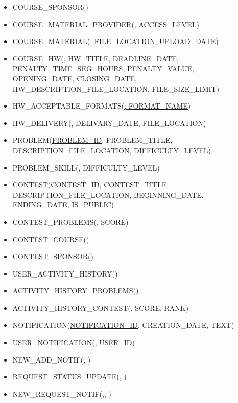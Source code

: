\documentclass{article}
\begin{document}
\begin{flushleft}
\begin{latin}
\begin{itemize}
            \item COURSE\_SPONSOR(\underline{})
            \item COURSE\_MATERIAL\_PROVIDER(\underline{}, ACCESS\_LEVEL)
            \item COURSE\_MATERIAL(\underline{, FILE\_LOCATION}, UPLOAD\_DATE)
            \item COURSE\_HW(\underline{, HW\_TITLE}, DEADLINE\_DATE, PENALTY\_TIME\_SEG\_HOURS, PENALTY\_VALUE, OPENING\_DATE, CLOSING\_DATE, HW\_DESCRIPTION\_FILE\_LOCATION, FILE\_SIZE\_LIMIT)
            \item HW\_ACCEPTABLE\_FORMATS(\underline{, FORMAT\_NAME})
            \item HW\_DELIVERY(\underline{}, DELIVARY\_DATE, FILE\_LOCATION)
            \item PROBLEM(\underline{PROBLEM\_ID}, PROBLEM\_TITLE, DESCRIPTION\_FILE\_LOCATION, DIFFICULTY\_LEVEL)
            \item PROBLEM\_SKILL(\underline{}, DIFFICULTY\_LEVEL)
            \item CONTEST(\underline{CONTEST\_ID}, CONTEST\_TITLE, DESCRIPTION\_FILE\_LOCATION, BEGINNING\_DATE, ENDING\_DATE, IS\_PUBLIC)
            \item CONTEST\_PROBLEMS(\underline{}, SCORE)
            \item CONTEST\_COURSE(\underline{})
            \item CONTEST\_SPONSOR(\underline{})
            \item USER\_ACTIVITY\_HISTORY(\underline{})
            \item ACTIVITY\_HISTORY\_PROBLEMS(\underline{})
            \item ACTIVITY\_HISTORY\_CONTEST(\underline{}, SCORE, RANK)
            \item NOTIFICATION(\underline{NOTIFICATION\_ID}, CREATION\_DATE, TEXT)
            \item USER\_NOTIFICATION(\underline{}, USER\_ID)
            \item NEW\_ADD\_NOTIF(\underline{}, )
            \item REQUEST\_STATUS\_UPDATE(\underline{}, )
            \item NEW\_REQUEST\_NOTIF(\underline{},, )
        \end{itemize}
    \end{latin}
\end{flushleft}
\end{document}
